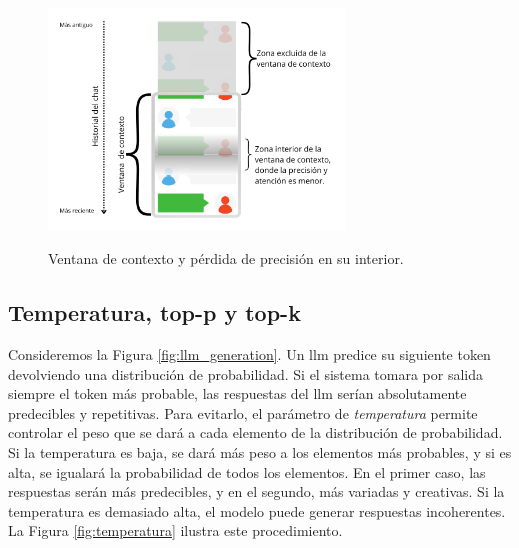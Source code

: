 \begin{figure}[H]
    \caption[Ventana de contexto y pérdida de precisión en su interior]{Ventana de contexto y pérdida de precisión en su interior.}
    \centering
    \includegraphics[width=0.7\textwidth]{./figuras/chat_ventana_lost_in_the_middle.png}
    \source{\propio}
    \label{fig:chat_ventana_lost_in_the_middle}
\end{figure}



\subsection{Temperatura, top-p y top-k}
\label{sec:hiperparametros_controlables}

Consideremos la Figura \ref{fig:llm_generation}. Un \gls{llm} predice su siguiente token devolviendo una distribución de probabilidad. Si el sistema tomara por salida siempre el token más probable, las respuestas del \gls{llm} serían absolutamente predecibles y repetitivas. Para evitarlo, el parámetro de \emph{temperatura} permite controlar el peso que se dará a cada elemento de la distribución de probabilidad. Si la temperatura es baja, se dará más peso a los elementos más probables, y si es alta, se igualará la probabilidad de todos los elementos. En el primer caso, las respuestas serán más predecibles, y en el segundo, más variadas y creativas. Si la temperatura es demasiado alta, el modelo puede generar respuestas incoherentes. La Figura \ref{fig:temperatura} ilustra este procedimiento.

